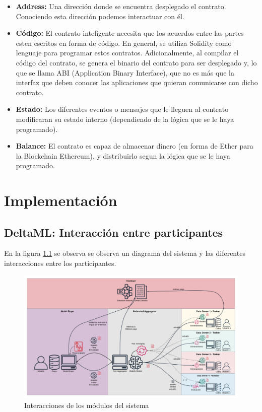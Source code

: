 \documentclass[
11pt, %
oneside, %
spanish, %
singlespacing, %
parskip, %
headsepline, %
chapterinoneline, %
]{MastersDoctoralThesis} %
\begin{document}
\begin{itemize}
\item \textbf{Address:} Una dirección donde se encuentra desplegado el contrato. Conociendo esta dirección podemos interactuar con él.
\item \textbf{Código:} El contrato inteligente necesita que los acuerdos entre las partes esten escritos en forma de código. En general, se utiliza Solidity como lenguaje para programar estos contratos. Adicionalmente, al compilar el código del contrato, se genera el binario del contrato para ser desplegado y, lo que se llama ABI (Application Binary Interface), que no es más que la interfaz que deben conocer las aplicaciones que quieran comunicarse con dicho contrato.
\item \textbf{Estado:} Los diferentes eventos o mensajes que le lleguen al contrato modificaran su estado interno (dependiendo de la lógica que se le haya programado).
\item  \textbf{Balance:} El contrato es capaz de almacenar dinero (en forma de Ether para la Blockchain Ethereum), y distribuirlo segun la lógica que se le haya programado.
\end{itemize}


\newpage

\chapter{Implementación}

\section{DeltaML: Interacción entre participantes}
En la figura \ref{fig:interact} se observa se observa un diagrama del sistema y las diferentes interacciones entre los participantes.

\begin{figure}[H]
  	\centering
	\includegraphics[scale=0.072]{imgs/deltaml_flow.png}
	\caption{Interacciones de los módulos del sistema}
	\label{fig:interact}
\end{figure}
\end{document}
